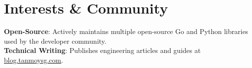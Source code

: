 \documentclass[letterpaper,11pt]{article}
\begin{document}
\section{Interests \& Community}
 \begin{itemize}[leftmargin=0.15in, label={}]
    \small{\item{
     \textbf{Open-Source}{: Actively maintains multiple open-source Go and Python libraries used by the developer community.} \\
     \textbf{Technical Writing}{: Publishes engineering articles and guides at \href{https://blog.tanmoysg.com}{\underline{blog.tanmoysg.com}}.} \\
    }}
 \end{itemize}

\end{document}

